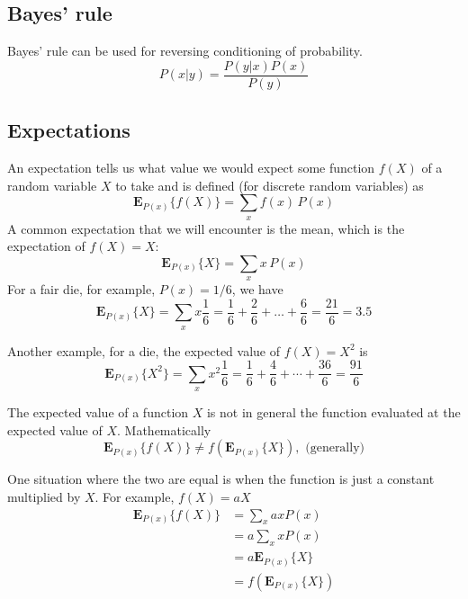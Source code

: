 \documentclass[a4paper,11pt]{article} %
\begin{document}
\subsection{Bayes' rule}

Bayes' rule can be used for reversing conditioning of probability.
\begin{equation}
P(x|y) = \frac{P(y|x) P(x)}{P(y)}
\end{equation}

\subsection{Expectations}

An expectation tells us what value we would expect some function $f(X)$ of a random variable
$X$ to take and is defined (for discrete random variables) as
\begin{equation}
\mathbf{E}_{P(x)}\{f(X)\} = \sum_{x} f(x)\,P(x)
\end{equation}
A common expectation that we will encounter is the mean, which is the expectation
of $f(X) = X$:
\begin{equation}
\mathbf{E}_{P(x)}\{X\} = \sum_{x} x\,P(x)
\end{equation}
For a fair die, for example, $P(x)=1/6$, we have
\begin{equation}
\mathbf{E}_{P(x)}\{X\} = \sum_{x} x \frac{1}{6} = \frac{1}{6} +
\frac{2}{6} + \ldots + \frac{6}{6} = \frac{21}{6} = 3.5
\end{equation}

Another example, for a die, the expected value of $f(X)=X^2$ is
\begin{equation}
\mathbf{E}_{P(x)}\{X^2\} = \sum_{x} x^2\frac{1}{6} =
\frac{1}{6} + \frac{4}{6} + \cdots + \frac{36}{6} = \frac{91}{6}
\end{equation}

The expected value of a function $X$ is not in general the function evaluated
at the expected value of $X$. Mathematically
\begin{equation}
\mathbf{E}_{P(x)}\{f(X)\} \neq f(\mathbf{E}_{P(x)}\{X\}),\,\,\text{(generally)}
\end{equation}

One situation where the two are equal is when the function is just a constant multiplied
by $X$. For example, $f(X) = aX$
\begin{align*}
\mathbf{E}_{P(x)}\{f(X)\} & = \sum_{x} ax P(x) \\
& = a\sum_{x} x P(x) \\
& = a\mathbf{E}_{P(x)}\{X\} \\
& = f\left(\mathbf{E}_{P(x)}\{X\}\right)
\end{align*}
\end{document}
